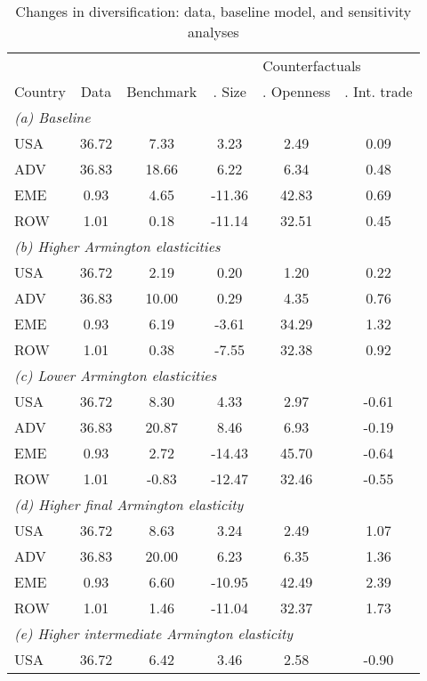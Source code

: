 \begin{table}[p]
\renewcommand{\arraystretch}{1.2}
\begin{center}
\begin{threeparttable}
\caption{Changes in diversification: data, baseline model, and sensitivity analyses}
\label{tab:results-bal-div-sens}
\begin{tabular}{l c c c c c}
\toprule
& & & \multicolumn{3}{c}{Counterfactuals}\\
\cmidrule(rl){4-6}
Country & \multicolumn{1}{p{2.1cm}}{\centering Data} & \multicolumn{1}{p{2.1cm}}{\centering Benchmark} & \multicolumn{1}{p{2.1cm}}{\centering 1. Size} & \multicolumn{1}{p{2.1cm}}{\centering 2. Openness} & \multicolumn{1}{p{2.1cm}}{\centering 3. Int. trade}\\
\midrule
\multicolumn{6}{l}{\textit{(a) Baseline}}\\
USA& 36.72&7.33&3.23&2.49&0.09\\
ADV& 36.83&18.66&6.22&6.34&0.48\\
EME& 0.93&4.65&-11.36&42.83&0.69\\
ROW& 1.01&0.18&-11.14&32.51&0.45\\
\midrule
\multicolumn{6}{l}{\textit{(b) Higher Armington elasticities}}\\
USA& 36.72&2.19&0.20&1.20&0.22\\
ADV& 36.83&10.00&0.29&4.35&0.76\\
EME& 0.93&6.19&-3.61&34.29&1.32\\
ROW& 1.01&0.38&-7.55&32.38&0.92\\
\midrule
\multicolumn{6}{l}{\textit{(c) Lower Armington elasticities}}\\
USA& 36.72&8.30&4.33&2.97&-0.61\\
ADV& 36.83&20.87&8.46&6.93&-0.19\\
EME& 0.93&2.72&-14.43&45.70&-0.64\\
ROW& 1.01&-0.83&-12.47&32.46&-0.55\\
\midrule
\multicolumn{6}{l}{\textit{(d) Higher final Armington elasticity}}\\
USA& 36.72&8.63&3.24&2.49&1.07\\
ADV& 36.83&20.00&6.23&6.35&1.36\\
EME& 0.93&6.60&-10.95&42.49&2.39\\
ROW& 1.01&1.46&-11.04&32.37&1.73\\
\midrule
\multicolumn{6}{l}{\textit{(e) Higher intermediate Armington elasticity}}\\
USA& 36.72&6.42&3.46&2.58&-0.90\\

\end{tabular}
\end{threeparttable}
\end{center}
\end{table}
